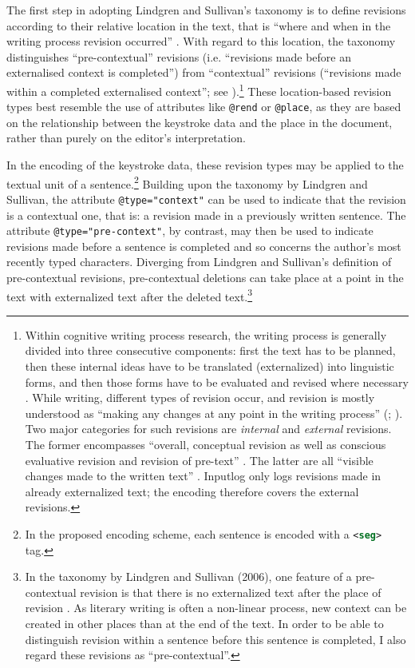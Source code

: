 \begin{paper}
The first step in adopting Lindgren and Sullivan's taxonomy is to define
revisions according to their relative location in the text, that is ``where and when in the
writing process revision occurred'' \citep[42]{lindgren_writing_2006}.
With regard to this location, the taxonomy distinguishes
``pre-contextual'' revisions (i.e. ``revisions made before an externalised
context is completed'') from ``contextual'' revisions (``revisions made
within a completed externalised context''; see \citealt[159]{lindgren_analysing_2006}).\footnote{Within cognitive writing process research, the
  writing process is generally divided into three consecutive
  components: first the text has to be planned, then these internal
  ideas have to be translated (externalized) into linguistic forms, and
  then those forms have to be evaluated and revised where necessary
 \citep{lindgren_writing_2006}. While writing, different types of
  revision occur, and revision is mostly understood as ``making any
  changes at any point in the writing process'' (\citealt[484]{fitzgerald_research_1987}; \citealt[346]{lindgren_revising_2019}). Two major categories for such revisions
  are \emph{internal} and \emph{external} revisions. The former
  encompasses ``overall, conceptual revision as well as conscious
  evaluative revision and revision of pre-text'' \citep[37]{lindgren_writing_2006}. The latter are all ``visible changes made to the written
  text'' \citep[37]{lindgren_writing_2006}. Inputlog only logs revisions made in already
  externalized text; the encoding therefore covers the external
  revisions.} These location-based revision types best resemble the use
of attributes like \lstinline[language=XML]!@rend! or \lstinline[language=XML]!@place!, as they are based on the
relationship between the keystroke data and the place in the document,
rather than purely on the editor's interpretation.

In the encoding of the keystroke data, these revision types may be
applied to the textual unit of a sentence.\footnote{In the proposed
  encoding scheme, each sentence is encoded with a
  \lstinline[language=XML]!<seg>! tag.} Building upon the taxonomy by
Lindgren and Sullivan, the attribute \lstinline[language=XML]!@type="context"! can be used to
indicate that the revision is a contextual one, that is: a revision made
in a previously written sentence. The attribute \lstinline[language=XML]!@type="pre-context"!, by
contrast, may then be used to indicate revisions made before a sentence
is completed and so concerns the author's most recently typed characters.
Diverging from Lindgren and Sullivan's definition of pre-contextual
revisions, pre-contextual deletions can take place at a point in the
text with externalized text after the deleted text.\footnote{In the
  taxonomy by Lindgren and Sullivan (2006), one feature of a
  pre-contextual revision is that there is no externalized text after
  the place of revision \citep[159]{lindgren_analysing_2006}. As literary writing is often a non-linear
  process, new context can be created in other places than at the end of
  the text. In order to be able to distinguish revision within a
  sentence before this sentence is completed, I also regard these
  revisions as ``pre-contextual''.}


\end{paper}
